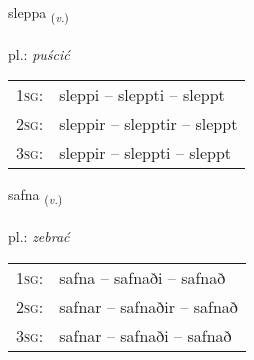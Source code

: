 \documentclass[frontgrid, backgrid]{flacards}\usepackage[]{graphicx}\usepackage[]{xcolor}
\begin{document}
\renewcommand{\flhead}{\vskip5pt \fboxsep=0pt {\small\bfseries\footnotesize Sagnorð | Verb}}
\renewcommand{\fcfoot}{\vskip5pt \fboxsep=0pt \hspace{2pt}{\small\bfseries\footnotesize 1K}}

\renewcommand{\blhead}{\vskip5pt {\small\bfseries\footnotesize Sagnorð | Verb }}
\renewcommand{\bcfoot}{\vskip5pt \hspace{2pt}{\small\bfseries\footnotesize 1K}}


{sleppa \small{\textsubscript{(\textit{v.})}} \\[1ex] %
\textphonetic{[stlɛhpa]} \\
pl.: \emph{puścić} \\  [2ex]
\renewcommand*{\arraystretch}{0.8}
\begin{tabular}{p{1cm}l}
\textsc{1sg}: & sleppi -- sleppti -- sleppt \\ 
\textsc{2sg}: & sleppir -- slepptir -- sleppt \\ 
\textsc{3sg}: & sleppir -- sleppti -- sleppt \\ 
\end{tabular}
}

\renewcommand{\flhead}{\vskip5pt \fboxsep=0pt {\small\bfseries\footnotesize Sagnorð | Verb}}
\renewcommand{\fcfoot}{\vskip5pt \fboxsep=0pt \hspace{2pt}{\small\bfseries\footnotesize 1K}}

\renewcommand{\blhead}{\vskip5pt {\small\bfseries\footnotesize Sagnorð | Verb }}
\renewcommand{\bcfoot}{\vskip5pt \hspace{2pt}{\small\bfseries\footnotesize 1K}}


{safna \small{\textsubscript{(\textit{v.})}} \\[1ex] %
\textphonetic{[sapna]} \\
pl.: \emph{zebrać} \\  [2ex]
\renewcommand*{\arraystretch}{0.8}
\begin{tabular}{p{1cm}l}
\textsc{1sg}: & safna -- safnaði -- safnað \\ 
\textsc{2sg}: & safnar -- safnaðir -- safnað \\ 
\textsc{3sg}: & safnar -- safnaði -- safnað \\ 
\end{tabular}
}
\end{document}
